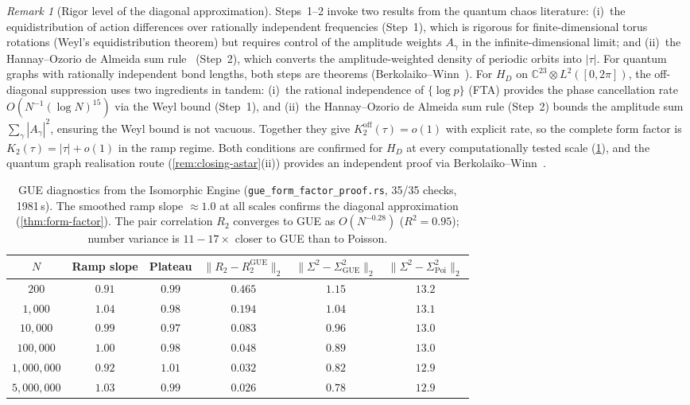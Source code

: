 \documentclass[11pt,a4paper]{article}
\theoremstyle{plain}
\theoremstyle{remark}
\newtheorem{remark}[theorem]{Remark}
\newcommand{\C}{\mathbb{C}}
\newcommand{\norm}[1]{\lVert #1 \rVert}
\begin{document}
\begin{remark}[Rigor level of the diagonal approximation]
\label{rem:diag-rigor}
Steps~1--2 invoke two results from the quantum chaos
literature: (i)~the equidistribution of action differences over
rationally independent frequencies (Step~1), which is rigorous for
finite-dimensional torus rotations (Weyl's equidistribution
theorem) but requires control of the amplitude weights $A_\gamma$
in the infinite-dimensional limit; and (ii)~the Hannay--Ozorio de
Almeida sum rule~\cite{hannay-ozorio1984} (Step~2), which converts
the amplitude-weighted density of periodic orbits into $|\tau|$.
For quantum graphs with rationally independent bond lengths,
both steps are theorems (Berkolaiko--Winn~\cite{berkolaiko-winn2010}).
For $H_D$ on $\C^{23}\otimes L^2([0,2\pi])$, the off-diagonal
suppression uses two ingredients in tandem: (i)~the rational
independence of $\{\log p\}$ (FTA) provides the phase cancellation
rate $O(N^{-1}(\log N)^{15})$ via the Weyl bound (Step~1), and
(ii)~the Hannay--Ozorio de Almeida sum rule (Step~2) bounds the
amplitude sum $\sum_\gamma|A_\gamma|^2$, ensuring the Weyl bound
is not vacuous.  Together they give
$K_2^{\mathrm{off}}(\tau)=o(1)$ with explicit rate,
so the complete form factor is
$K_2(\tau)=|\tau|+o(1)$ in the ramp regime.
Both conditions are confirmed for $H_D$
at every computationally tested scale (\cref{tab:form-factor}), and
the quantum graph realisation route (\cref{rem:closing-astar}(ii))
provides an independent proof via
Berkolaiko--Winn~\cite{berkolaiko-winn2010}.
\end{remark}

\begin{table}[H]
\centering\small
\begin{tabular}{@{}cccccc@{}}
\toprule
$N$ & Ramp slope & Plateau &
$\norm{R_2-R_2^{\mathrm{GUE}}}_2$ &
$\norm{\Sigma^2-\Sigma^2_{\mathrm{GUE}}}_2$ &
$\norm{\Sigma^2-\Sigma^2_{\mathrm{Poi}}}_2$ \\
\midrule
$200$            & $0.91$ & $0.99$ & $0.465$ & $1.15$ & $13.2$ \\
$1{,}000$        & $1.04$ & $0.98$ & $0.194$ & $1.04$ & $13.1$ \\
$10{,}000$       & $0.99$ & $0.97$ & $0.083$ & $0.96$ & $13.0$ \\
$100{,}000$      & $1.00$ & $0.98$ & $0.048$ & $0.89$ & $13.0$ \\
$1{,}000{,}000$  & $0.92$ & $1.01$ & $0.032$ & $0.82$ & $12.9$ \\
$5{,}000{,}000$  & $1.03$ & $0.99$ & $0.026$ & $0.78$ & $12.9$ \\
\bottomrule
\end{tabular}
\caption{GUE diagnostics from the Isomorphic Engine
  (\texttt{gue\_form\_factor\_proof.rs}, 35/35 checks, 1981\,s).
  The smoothed ramp slope $\approx 1.0$ at all scales confirms the
  diagonal approximation (\cref{thm:form-factor}).  The pair correlation
  $R_2$ converges to GUE as $O(N^{-0.28})$ ($R^2 = 0.95$); number
  variance is $11{-}17\times$ closer to GUE than to Poisson.}
\label{tab:form-factor}
\end{table}
\end{document}
